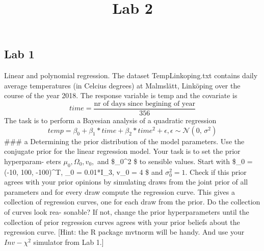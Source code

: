 \documentclass[]{article}
\title{Lab 2}
\author{}
\date{\vspace{-2.5em}}
\begin{document}
\maketitle

\hypertarget{lab-1}{%
\subsection{Lab 1}\label{lab-1}}

Linear and polynomial regression. The dataset TempLinkoping.txt contains
daily average temperatures (in Celcius degrees) at Malmslätt, Linköping
over the course of the year 2018. The response variable is temp and the
covariate is
\[ time = \frac{\mbox{nr of days since begining of year}}{356}\] The
task is to perform a Bayesian analysis of a quadratic regression
\[ temp = \beta_0 + \beta_1 * time + \beta_2 * time^2 + \epsilon, \epsilon \sim \mathcal{N}(0,\,\sigma^{2})\]
\#\#\# a Determining the prior distribution of the model parameters. Use
the conjugate prior for the linear regression model. Your task is to set
the prior hyperparam- eters \(\mu_0, \Omega_0, v_0,\) and
\$\sigma\_0\^{}2 \$ to sensible values. Start with \$\mu\_0 = (-10, 100,
-100)\^{}T, \omega\_0 = 0.01*I\_3, v\_0 = 4 \$ and \(\sigma_0^2 = 1\).
Check if this prior agrees with your prior opinions by simulating draws
from the joint prior of all parameters and for every draw compute the
regression curve. This gives a collection of regression curves, one for
each draw from the prior. Do the collection of curves look rea- sonable?
If not, change the prior hyperparameters until the collection of prior
regression curves agrees with your prior beliefs about the regression
curve. {[}Hint: the R package mvtnorm will be handy. And use your
\(Inv-\chi^2\) simulator from Lab 1.{]}
\end{document}
